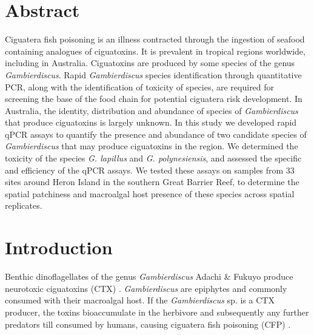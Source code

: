 \documentclass[12pt]{article}
\begin{document}
\section{Abstract}
Ciguatera fish poisoning is an illness contracted through the ingestion of seafood containing analogues of ciguatoxins. It is prevalent in tropical regions worldwide, including in Australia. Ciguatoxins are produced by some species of the genus \emph{Gambierdiscus}. Rapid \emph{Gambierdiscus} species identification through quantitative PCR, along with the identification of toxicity of species, are required for screening the base of the food chain for potential ciguatera risk development. In Australia, the identity, distribution and abundance of species of \textit{Gambierdiscus} that produce ciguatoxins is largely unknown. In this study we developed rapid qPCR assays to quantify the presence and abundance of two candidate species of \textit{Gambierdiscus} that may produce ciguatoxins in the region. We determined the toxicity of the species \textit{G. lapillus} and \textit{G. polynesiensis}, and assessed the specific and efficiency of the qPCR assays. We tested these assays on samples from 33 sites around Heron Island in the southern Great Barrier Reef, to determine the spatial patchiness and macroalgal host presence of these species across spatial replicates.  


\newpage
\section{Introduction}
Benthic dinoflagellates of the genus \emph{Gambierdiscus} Adachi \& Fukuyo produce neurotoxic ciguatoxins (CTX) \cite{adachi1979thecal}. \emph{Gambierdiscus} are epiphytes and commonly consumed with their macroalgal host. If the \emph{Gambierdiscus} sp. is a CTX producer, the toxins bioaccumulate in the herbivore and subsequently any further predators till consumed by humans, causing ciguatera fish poisoning (CFP) \citep{chinain1997intraspecific,holmes1998gambierdiscus}. %
\end{document}
